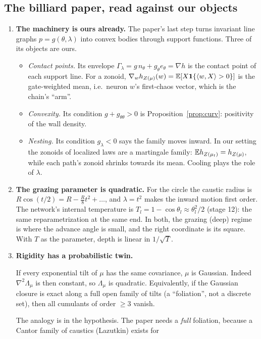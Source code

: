 \label{sec:billiards}
\subsection{The billiard paper, read against our objects}
\begin{enumerate}[leftmargin=*]
\item \textbf{The machinery is ours already.} The paper's last step turns invariant line graphs $p=g(\theta,\lambda)$ into convex bodies
through support functions. Three of its objects are ours.
\begin{itemize}
\item \emph{Contact points.} Its envelope $\Gamma_\lambda=g\,n_\theta+g_\theta e_\theta=\nabla h$ is the contact point of each support line. For a
zonoid, $\nabla_wh_{Z(\mu)}(w)=\mathbb E[X\mathbf 1\{\langle w,X\rangle>0\}]$ is the gate-weighted mean, i.e.\ neuron $w$'s first-chaos vector, which
is the chain's ``arm''.
\item \emph{Convexity.} Its condition $g+g_{\theta\theta}>0$ is Proposition~\ref{prop:curv}: positivity of the wall density.
\item \emph{Nesting.} Its condition $g_\lambda<0$ says the family moves inward. In our setting the zonoids of localized laws are a
martingale family: $\mathbb E h_{Z(\mu_t)}=h_{Z(\mu)}$, while each path's zonoid shrinks towards its mean. Cooling plays the role of $\lambda$.
\end{itemize}
\item \textbf{The grazing parameter is quadratic.} For the circle the caustic radius is $R\cos(t/2)=R-\frac R8t^2+\dots$, and $\lambda=t^2$
makes the inward motion first order. The network's internal temperature is $T_l=1-\cos\theta_l\approx\theta_l^2/2$ (stage 12): the
same reparametrization at the same end. In both, the grazing (deep) regime is where the advance angle is small, and the right
coordinate is its square. With $T$ as the parameter, depth is linear in $1/\sqrt T$.
\item \textbf{Rigidity has a probabilistic twin.}
\begin{proposition}
If every exponential tilt of $\mu$ has the same covariance, $\mu$ is Gaussian. Indeed $\nabla^2\Lambda_\mu$ is then constant, so $\Lambda_\mu$ is
quadratic. Equivalently, if the Gaussian closure is exact along a full open family of tilts (a ``foliation'', not a discrete set),
then all cumulants of order $\ge3$ vanish.
\end{proposition}
The analogy is in the hypothesis. The paper needs a \emph{full} foliation, because a Cantor family of caustics (Lazutkin) exists for

\end{enumerate}

